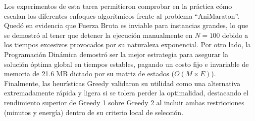 Los experimentos de esta tarea permitieron comprobar en la práctica cómo escalan los diferentes enfoques algorítmicos frente al problema ``AniMaraton''. Quedó en evidencia que Fuerza Bruta es inviable para instancias grandes, lo que se demostró al tener que detener la ejecución manualmente en $N=100$ debido a los tiempos excesivos provocados por su naturaleza exponencial. Por otro lado, la Programación Dinámica demostró ser la mejor estrategia para asegurar la solución óptima global en tiempos estables, pagando un costo fijo e invariable de memoria de 21.6 MB dictado por su matriz de estados ($O(M \times E)$). Finalmente, las heurísticas Greedy validaron su utilidad como una alternativa extremadamente rápida y ligera si se tolera perder la optimalidad, destacando el rendimiento superior de Greedy 1 sobre Greedy 2 al incluir ambas restricciones (minutos y energía) dentro de su criterio local de selección.